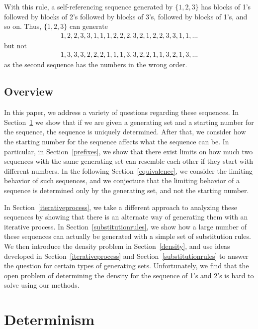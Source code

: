 \documentclass[runningheads,a4paper]{llncs}
\begin{document}
With this rule, a self-referencing sequence generated by $\{1,2,3\}$ has blocks of 1's followed by blocks of 2's followed by blocks of 3's, followed by blocks of 1's, and so on. Thus, $\{1,2,3\}$ can generate
\begin{align*}
1,2,2,3,3,1,1,1,2,2,2,3,2,1,2,2,3,3,1,1,\dots
\end{align*}
but not
\begin{align*}
1,3,3,3,2,2,2,1,1,1,3,3,2,2,1,1,3,2,1,3,\dots
\end{align*}
as the second sequence has the numbers in the wrong order.

\subsection{Overview}

In this paper, we address a variety of questions regarding these sequences. In Section~\ref{determinism} we show that if we are given a generating set and a starting number for the sequence, the sequence is uniquely determined. After that, we consider how the starting number for the sequence affects what the sequence can be. In particular, in Section~\ref{prefixes}, we show that there exist limits on how much two sequences with the same generating set can resemble each other if they start with different numbers. In the following Section~\ref{equivalence}, we consider the limiting behavior of such sequences, and we conjecture that the limiting behavior of a sequence is determined only by the generating set, and not the starting number. 

In Section~\ref{iterativeprocess}, we take a different approach to analyzing these sequences by showing that there is an alternate way of generating them with an iterative process. In Section~\ref{substitutionrules}, we show how a large number of these sequences can actually be generated with a simple set of substitution rules. We then introduce the density problem in Section~\ref{density}, and use ideas developed in Section~\ref{iterativeprocess} and Section~\ref{substitutionrules} to answer the question for certain types of generating sets. Unfortunately, we find that the open problem of determining the density for the sequence of 1's and 2's is hard to solve using our methods.

\section{Determinism}
\label{determinism}
\end{document}

